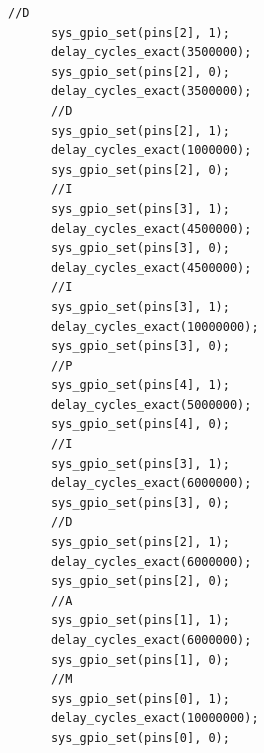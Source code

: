 \documentclass[12pt,letterpaper]{article}
\begin{document}
\begin{lstlisting}[style=modernc, caption={Algoritmo para \texttt{task\_lullaby} en \texttt{user\_app.c}}]
      //D
      sys_gpio_set(pins[2], 1);
      delay_cycles_exact(3500000);
      sys_gpio_set(pins[2], 0);
      delay_cycles_exact(3500000);
      //D
      sys_gpio_set(pins[2], 1);
      delay_cycles_exact(1000000);
      sys_gpio_set(pins[2], 0);
      //I
      sys_gpio_set(pins[3], 1);
      delay_cycles_exact(4500000);
      sys_gpio_set(pins[3], 0);
      delay_cycles_exact(4500000);
      //I
      sys_gpio_set(pins[3], 1);
      delay_cycles_exact(10000000);
      sys_gpio_set(pins[3], 0);
      //P
      sys_gpio_set(pins[4], 1);
      delay_cycles_exact(5000000);
      sys_gpio_set(pins[4], 0);
      //I
      sys_gpio_set(pins[3], 1);
      delay_cycles_exact(6000000);
      sys_gpio_set(pins[3], 0);
      //D
      sys_gpio_set(pins[2], 1);
      delay_cycles_exact(6000000);
      sys_gpio_set(pins[2], 0);
      //A
      sys_gpio_set(pins[1], 1);
      delay_cycles_exact(6000000);
      sys_gpio_set(pins[1], 0);
      //M
      sys_gpio_set(pins[0], 1);
      delay_cycles_exact(10000000);
      sys_gpio_set(pins[0], 0);


\end{lstlisting}
\end{document}
